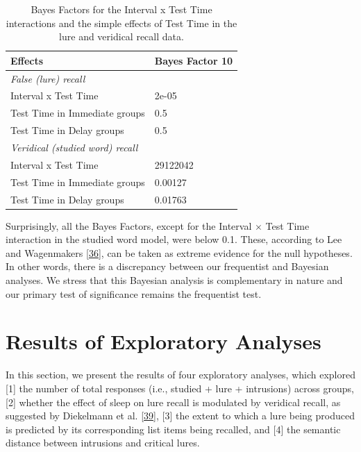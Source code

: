 \documentclass[
]{article}
\begin{document}
\begin{table}[H]

\caption{\label{tab:table5}Bayes Factors for the Interval x Test Time interactions and the simple effects of Test Time in the lure and veridical recall data.}
\centering
\begin{tabular}[t]{ll}
\toprule
Effects & Bayes Factor 10\\
\midrule
\em{False (lure) recall} & \em{}\\
Interval x Test Time & 2e-05\\
Test Time in Immediate groups & 0.5\\
Test Time in Delay groups & 0.5\\
\em{Veridical (studied word) recall} & \em{}\\
\addlinespace
Interval x Test Time & 29122042\\
Test Time in Immediate groups & 0.00127\\
Test Time in Delay groups & 0.01763\\
\bottomrule
\end{tabular}
\end{table}

Surprisingly, all the Bayes Factors, except for the Interval \(\times\) Test Time interaction in the studied word model, were below 0.1. These, according to Lee and Wagenmakers {[}\protect\hyperlink{ref-lee2014a}{36}{]}, can be taken as extreme evidence for the null hypotheses. In other words, there is a discrepancy between our frequentist and Bayesian analyses. We stress that this Bayesian analysis is complementary in nature and our primary test of significance remains the frequentist test.

\hypertarget{results-of-exploratory-analyses}{%
\section{Results of Exploratory Analyses}\label{results-of-exploratory-analyses}}

In this section, we present the results of four exploratory analyses, which explored {[}1{]} the number of total responses (i.e., studied + lure + intrusions) across groups, {[}2{]} whether the effect of sleep on lure recall is modulated by veridical recall, as suggested by Diekelmann et al. {[}\protect\hyperlink{ref-diekelmann2010a}{39}{]}, {[}3{]} the extent to which a lure being produced is predicted by its corresponding list items being recalled, and {[}4{]} the semantic distance between intrusions and critical lures.
\end{document}
